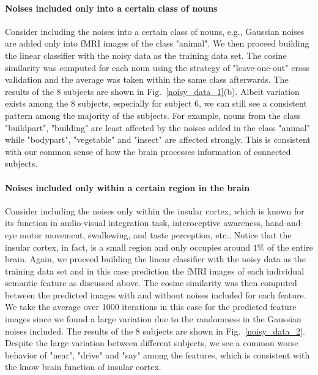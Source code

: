 \documentclass{article}
\begin{document}
\paragraph{Noises included only into a certain class of nouns} Consider including the noises into a certain class of nouns, e.g., Gaussian noises are added only into fMRI images of the class "animal". We then proceed building the linear classifier with the noisy data as the training data set. The cosine similarity was computed for each noun using the strategy of "leave-one-out" cross validation and the average was taken within the same class afterwards. The results of the 8 subjects are shown in Fig.~\ref{noisy_data_1}(b). Albeit variation exists among the 8 subjects, especially for subject 6, we can still see a consistent pattern among the majority of the subjects. For example, nouns from the class "buildpart", "building" are least affected by the noises added in the class "animal" while "bodypart", "vegetable" and "insect" are affected strongly. This is consistent with our common sense of how the brain processes information of connected subjects.

\paragraph{Noises included only within a certain region in the brain} Consider including the noises only within the insular cortex, which is known for its function in audio-visual integration task, interoceptive awareness, hand-and-eye motor movement, swallowing, and taste perception, etc.. Notice that the insular cortex, in fact, is a small region and only occupies around $1\%$ of the entire brain. Again, we proceed building the linear classifier with the noisy data as the training data set and in this case prediction the fMRI images of each individual semantic feature as discussed above. The cosine similarity was then computed between the predicted images with and without noises included for each feature.  We take the average over 1000 iterations in this case for the predicted feature images since we found a large variation due to the randomness in the Gaussian noises included. The results of the 8 subjects are shown in Fig.~\ref{noisy_data_2}. Despite the large variation between different subjects, we see a common worse behavior of "near", "drive" and "say" among the features, which is consistent with the know brain function of insular cortex.
\end{document}
